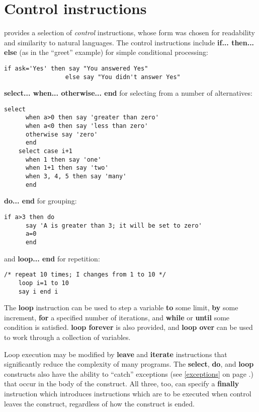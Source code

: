 \section{Control instructions}
\nr{} provides a selection of \emph{control} instructions, whose form was
chosen for readability and similarity to natural languages. The
control instructions include \textbf{if... then... else} (as in the “greet”
example) for simple conditional processing:
\begin{lstlisting}[label=Conditional,caption=Conditional]
    if ask='Yes' then say "You answered Yes"
                 else say "You didn't answer Yes"
\end{lstlisting}
\textbf{select... when... otherwise... end} for selecting from a number of
alternatives:
\begin{lstlisting}[label=selectwhenotherwise,caption=select - when - otherwise]
    select
      when a>0 then say 'greater than zero'
      when a<0 then say 'less than zero'
      otherwise say 'zero'
      end
    select case i+1
      when 1 then say 'one'
      when 1+1 then say 'two'
      when 3, 4, 5 then say 'many'
      end
\end{lstlisting}
\textbf{do... end} for grouping:
\begin{lstlisting}[label=doend,caption=do - end]
    if a>3 then do
      say 'A is greater than 3; it will be set to zero'
      a=0
      end
\end{lstlisting}
and \textbf{loop... end} for repetition:
\begin{lstlisting}[label=loopend,caption=loop - end]
    /* repeat 10 times; I changes from 1 to 10 */
    loop i=1 to 10
    say i end i
\end{lstlisting}
The \textbf{loop} instruction can be used to step a variable
\textbf{to} some limit, \textbf{by} some increment, \textbf{for} a
specified number of iterations, and \textbf{while} or \textbf{until}
some condition is satisfied. \textbf{loop forever} is also provided,
and \textbf{loop over} can be used to work through a collection of
variables.

Loop execution may be modified by \textbf{leave} and \textbf{iterate} instructions that significantly reduce the complexity of many programs.
The \textbf{select}, \textbf{do}, and \textbf{loop} constructs also have the ability to “catch”
exceptions (see \ref{exceptions} on page \pageref{exceptions}.) that occur in the body of the construct. All
three, too, can specify a \textbf{finally} instruction which introduces
instructions which are to be executed when control leaves the
construct, regardless of how the construct is ended.


